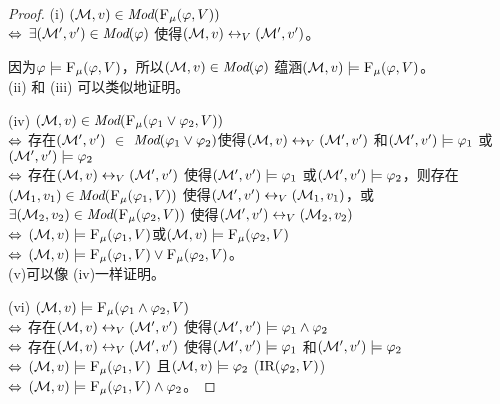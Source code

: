 \begin{proof}
	(i) $({\cal M},v) \in \textit{Mod}({\textsc{F}_{\textsc{$\mu$}}}(\varphi, V))$\\
	$\Leftrightarrow$ $\exists ({\cal M}',v') \in \textit{Mod}(\varphi)$ 使得$({\cal M}, v) \leftrightarrow_V ({\cal M}',v')$。
	
	因为$\varphi \models {\textsc{F}_{\textsc{$\mu$}}}(\varphi, V)$，所以$({\cal M},v) \in \textit{Mod}(\varphi)$ 蕴涵$({\cal M},v) \models {\textsc{F}_{\textsc{$\mu$}}}(\varphi, V)$。\\
	
	
	(ii) 和 (iii) 可以类似地证明。
	
	(iv)  $({\cal M},v)\in \textit{Mod}({\textsc{F}_{\textsc{$\mu$}}}(\varphi_1 \vee \varphi_2, V))$\\
	$\Leftrightarrow$ 存在$({\cal M}',v')$ $\in$  $\textit{Mod}(\varphi_1\vee \varphi_2)$使得$({\cal M},v) \leftrightarrow_V ({\cal M}',v')$ 和$({\cal M}',v') \models \varphi_1$ 或$({\cal M}',v') \models \varphi_2$ \\
	$\Leftrightarrow$ 存在$({\cal M},v) \leftrightarrow_V ({\cal M}',v')$ 使得$({\cal M}',v') \models \varphi_1$ 或$({\cal M}',v') \models \varphi_2$，则存在$({\cal M}_1,v_1) \in \textit{Mod}({\textsc{F}_{\textsc{$\mu$}}}(\varphi_1, V))$ 使得$({\cal M}',v') \leftrightarrow_V ({\cal M}_1,v_1)$，或$\exists({\cal M}_2,v_2) \in \textit{Mod}({\textsc{F}_{\textsc{$\mu$}}}(\varphi_2, V))$ 使得$({\cal M}',v') \leftrightarrow_V ({\cal M}_2,v_2)$\\
	$\Leftrightarrow$ $({\cal M},v) \models {\textsc{F}_{\textsc{$\mu$}}}(\varphi_1, V)$或$({\cal M},v) \models  {\textsc{F}_{\textsc{$\mu$}}}(\varphi_2, V)$\\
	$\Leftrightarrow$ $({\cal M},v) \models {\textsc{F}_{\textsc{$\mu$}}}(\varphi_1, V) \vee {\textsc{F}_{\textsc{$\mu$}}}(\varphi_2, V)$。
	\\
	
	
	(v)可以像 (iv)一样证明。
	
	(vi) $({\cal M},v) \models {\textsc{F}_{\textsc{$\mu$}}}(\varphi_1 \wedge \varphi_2,V)$\\
	$\Leftrightarrow$ 存在$({\cal M}, v) \leftrightarrow_V ({\cal M}',v')$ 使得$({\cal M}',v') \models \varphi_1 \wedge \varphi_2$\\
	$\Leftrightarrow$ 存在$({\cal M}, v) \leftrightarrow_V ({\cal M}',v')$ 使得$({\cal M}', v') \models \varphi_1$ 和$({\cal M}', v') \models \varphi_2$\\
	$\Leftrightarrow$  $({\cal M}, v) \models {\textsc{F}_{\textsc{$\mu$}}}(\varphi_1,V)$ 且$({\cal M},v) \models \varphi_2$ \hfill ($\textrm{IR}(\varphi_2, V)$)\\
	$\Leftrightarrow$ $({\cal M},v) \models {\textsc{F}_{\textsc{$\mu$}}}(\varphi_1,V) \wedge \varphi_2$。
\end{proof}

